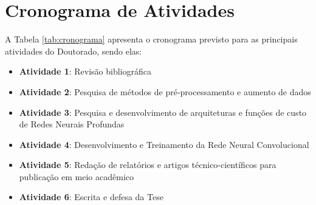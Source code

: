 \section{Cronograma de Atividades}

A  Tabela \ref{tab:cronograma} apresenta o cronograma previsto para as principais atividades do  Doutorado, sendo elas:

\begin{itemize}
\item \textbf{Atividade 1}: Revisão bibliográfica 
\item \textbf{Atividade 2}: Pesquisa de métodos de pré-processamento e aumento de dados
\item \textbf{Atividade 3}: Pesquisa e desenvolvimento de arquiteturas e funções de custo de Redes Neurais Profundas
\item \textbf{Atividade 4}: Desenvolvimento e Treinamento da Rede Neural Convolucional
\item \textbf{Atividade 5}: Redação  de  relatórios  e  artigos  técnico-científicos  para  publicação  em  meio  acadêmico
\item \textbf{Atividade 6}: Escrita e defesa da Tese
\end{itemize}

